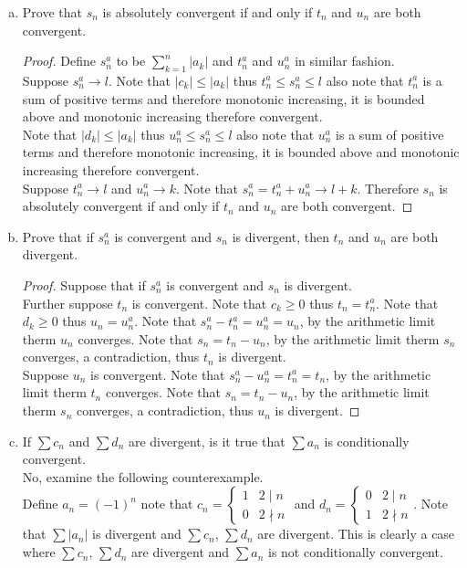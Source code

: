 \documentclass[12pt]{article}
\theoremstyle{homework}
\begin{document}
\begin{enumerate}[a)]
\item
Prove that $s_n$ is absolutely convergent if and only if $t_n$ and $u_n$ are both convergent.\\
\begin{proof}
Define $s^a_n$ to be $\sum_{k=1}^n |a_k|$ and $t^a_n$ and $u_n^a$ in similar fashion.\\
Suppose $s^a_n\rightarrow l$.  Note that $|c_k|\leq |a_k|$ thus $t^a_n\leq s^a_n\leq l$ also note that $t^a_n$ is a sum of positive terms and therefore monotonic increasing, it is bounded above and monotonic increasing therefore convergent.\\
Note that $|d_k|\leq |a_k|$ thus $u^a_n\leq s^a_n\leq l$ also note that $u^a_n$ is a sum of positive terms and therefore monotonic increasing, it is bounded above and monotonic increasing therefore convergent.\\
Suppose $t^a_n\rightarrow l$ and $u^a_n\rightarrow k$.  Note that $s^a_n=t^a_n+u^a_n\rightarrow l+k$.  Therefore $s_n$ is absolutely convergent if and only if $t_n$ and $u_n$ are both convergent.
\end{proof}
\item
Prove that if $s^a_n$ is convergent and $s_n$ is divergent, then $t_n$ and $u_n$ are both divergent.
\begin{proof}
Suppose that if $s^a_n$ is convergent and $s_n$ is divergent.\\
Further suppose $t_n$ is convergent.  Note that $c_k\geq 0$ thus $t_n=t^a_n$.  Note that $d_k\geq 0$ thus $u_n=u^a_n$.  Note that $s^a_n-t^a_n=u^a_n=u_n$, by the arithmetic limit therm $u_n$ converges.  Note that $s_n=t_n-u_n$, by the arithmetic limit therm $s_n$ converges, a contradiction, thus $t_n$ is divergent.\\
Suppose $u_n$ is convergent.  Note that $s^a_n-u^a_n=t^a_n=t_n$, by the arithmetic limit therm $t_n$ converges.  Note that $s_n=t_n-u_n$, by the arithmetic limit therm $s_n$ converges, a contradiction, thus $u_n$ is divergent.
\end{proof}
\item
If $\sum c_n$ and $\sum d_n$ are divergent, is it true that $\sum a_n$ is conditionally convergent.\\
No, examine the following counterexample.\\
Define $a_n=(-1)^n$ note that $c_n=\begin{cases}1 & 2\mid n\\ 0 & 2\nmid n\end{cases}$ and $d_n=\begin{cases}0 & 2\mid n\\ 1 & 2\nmid n\end{cases}$.  Note that $\sum |a_n|$ is divergent and $\sum c_n$, $\sum d_n$ are divergent.  This is clearly a case where $\sum c_n$, $\sum d_n$ are divergent and $\sum a_n$ is not conditionally convergent.
\end{enumerate}
\end{document}
